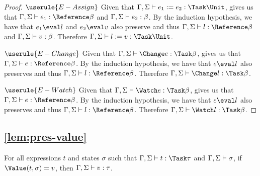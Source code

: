 \begin{proof}
  \case
    {$\userule{E-Assign}$}
    {Given that $\Gamma,\Sigma\infers e_1 := e_2 :\Task \Unit$,  gives us that $\Gamma,\Sigma\infers e_1:\Reference \beta$ and $\Gamma,\Sigma\vdash e_2:\beta$.
    By the induction hypothesis, we have that $e_1\eval l$ and $e_2\eval v$ also preserve and thus $\Gamma,\Sigma\infers l:\Reference \beta$ and $\Gamma,\Sigma\vdash v:\beta$.
    Therefore $\Gamma,\Sigma\infers l:=v:\Task \Unit$. }

  \case
    {$\userule{E-Change}$}
    {Given that $\Gamma,\Sigma\infers \Change e :\Task \beta$,  gives us that $\Gamma,\Sigma\infers e:\Reference \beta$.
    By the induction hypothesis, we have that $e\eval l$ also preserves and thus $\Gamma,\Sigma\infers l:\Reference \beta$.
    Therefore $\Gamma,\Sigma\infers \Change l:\Task\beta$.}

  \case
    {$\userule{E-Watch}$}
    {Given that $\Gamma,\Sigma\infers \Watch e :\Task \beta$,  gives us that $\Gamma,\Sigma\infers e:\Reference \beta$.
    By the induction hypothesis, we have that $e\eval l$ also preserves and thus $\Gamma,\Sigma\infers l:\Reference \beta$.
    Therefore $\Gamma,\Sigma\infers \Watch l:\Task\beta$.}
\end{proof}


\subsection{\cref{lem:pres-value}}

\begin{lemma}
  For all expressions $t$ and states $\sigma$
  such that $\Gamma,\Sigma \infers t:\Task\tau$ and $\Gamma,\Sigma \vdash \sigma$,
  if $\Value(t,\sigma)=v$,
  then $\Gamma,\Sigma \vdash v:\tau$.
  \label{lem:pres-value}
\end{lemma}

